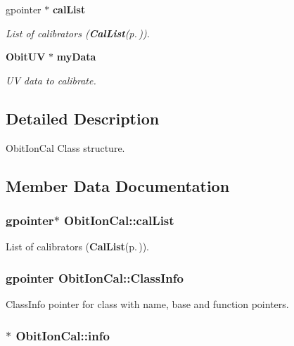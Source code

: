 \begin{CompactItemize}
gpointer $\ast$ {\bf cal\-List}
\begin{CompactList}\small\item\em List of calibrators ({\bf Cal\-List}{\rm (p.\,\pageref{structCalList})}). \item\end{CompactList}\item 
{\bf Obit\-UV} $\ast$ {\bf my\-Data}
\begin{CompactList}\small\item\em UV data to calibrate. \item\end{CompactList}\end{CompactItemize}


\subsection{Detailed Description}
Obit\-Ion\-Cal Class structure. 



\subsection{Member Data Documentation}
\subsubsection{\setlength{\rightskip}{0pt plus 5cm}gpointer$\ast$ {\bf Obit\-Ion\-Cal::cal\-List}}\label{structObitIonCal_o6}


List of calibrators ({\bf Cal\-List}{\rm (p.\,\pageref{structCalList})}). 

\subsubsection{\setlength{\rightskip}{0pt plus 5cm}gpointer {\bf Obit\-Ion\-Cal::Class\-Info}}\label{structObitIonCal_o1}


Class\-Info pointer for class with name, base and function pointers. 

\subsubsection{$\ast$ {\bf Obit\-Ion\-Cal::info}}\label{structObitIonCal_o5}


